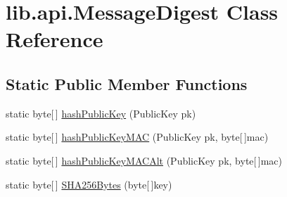 \hypertarget{classlib_1_1api_1_1MessageDigest}{\section{lib.\+api.\+Message\+Digest Class Reference}
\label{classlib_1_1api_1_1MessageDigest}
}
\subsection*{Static Public Member Functions}
\begin{DoxyCompactItemize}
\item 
static byte\mbox{[}$\,$\mbox{]} \hyperlink{classlib_1_1api_1_1MessageDigest_a928030678791a5ea1112d58ed740b956}{hash\+Public\+Key} (Public\+Key pk)
\item 
static byte\mbox{[}$\,$\mbox{]} \hyperlink{classlib_1_1api_1_1MessageDigest_a2b0cabe98c65c8e9f959563c63dbb0df}{hash\+Public\+Key\+M\+A\+C} (Public\+Key pk, byte\mbox{[}$\,$\mbox{]}mac)
\item 
static byte\mbox{[}$\,$\mbox{]} \hyperlink{classlib_1_1api_1_1MessageDigest_a8ae0db81a402dbb0e301b0cf82aa3d71}{hash\+Public\+Key\+M\+A\+C\+Alt} (Public\+Key pk, byte\mbox{[}$\,$\mbox{]}mac)
\item 
static byte\mbox{[}$\,$\mbox{]} \hyperlink{classlib_1_1api_1_1MessageDigest_a2d69c865e045d5a3e58ccec9a9cf28bc}{S\+H\+A256\+Bytes} (byte\mbox{[}$\,$\mbox{]}key)
\end{DoxyCompactItemize}


